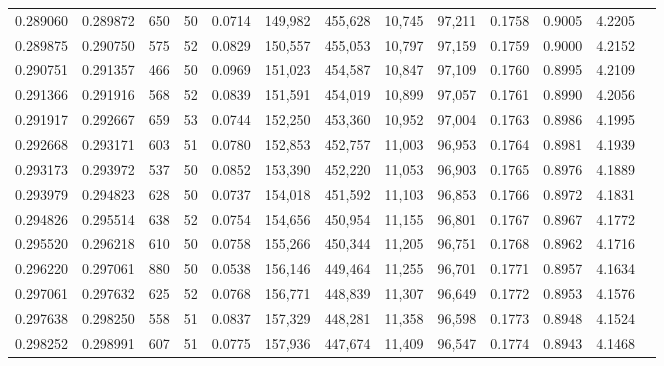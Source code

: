 \begin{tabular}{rrrrrrrrrrrrr}
0.289060 & 0.289872 &   650 &  50 &                                     0.0714 & 149,982 & 455,628 &  10,745 &  97,211 & 0.1758 & 0.9005 & 4.2205 \\
0.289875 & 0.290750 &   575 &  52 &                                     0.0829 & 150,557 & 455,053 &  10,797 &  97,159 & 0.1759 & 0.9000 & 4.2152 \\
0.290751 & 0.291357 &   466 &  50 &                                     0.0969 & 151,023 & 454,587 &  10,847 &  97,109 & 0.1760 & 0.8995 & 4.2109 \\
0.291366 & 0.291916 &   568 &  52 &                                     0.0839 & 151,591 & 454,019 &  10,899 &  97,057 & 0.1761 & 0.8990 & 4.2056 \\
0.291917 & 0.292667 &   659 &  53 &                                     0.0744 & 152,250 & 453,360 &  10,952 &  97,004 & 0.1763 & 0.8986 & 4.1995 \\
0.292668 & 0.293171 &   603 &  51 &                                     0.0780 & 152,853 & 452,757 &  11,003 &  96,953 & 0.1764 & 0.8981 & 4.1939 \\
0.293173 & 0.293972 &   537 &  50 &                                     0.0852 & 153,390 & 452,220 &  11,053 &  96,903 & 0.1765 & 0.8976 & 4.1889 \\
0.293979 & 0.294823 &   628 &  50 &                                     0.0737 & 154,018 & 451,592 &  11,103 &  96,853 & 0.1766 & 0.8972 & 4.1831 \\
0.294826 & 0.295514 &   638 &  52 &                                     0.0754 & 154,656 & 450,954 &  11,155 &  96,801 & 0.1767 & 0.8967 & 4.1772 \\
0.295520 & 0.296218 &   610 &  50 &                                     0.0758 & 155,266 & 450,344 &  11,205 &  96,751 & 0.1768 & 0.8962 & 4.1716 \\
0.296220 & 0.297061 &   880 &  50 &                                     0.0538 & 156,146 & 449,464 &  11,255 &  96,701 & 0.1771 & 0.8957 & 4.1634 \\
0.297061 & 0.297632 &   625 &  52 &                                     0.0768 & 156,771 & 448,839 &  11,307 &  96,649 & 0.1772 & 0.8953 & 4.1576 \\
0.297638 & 0.298250 &   558 &  51 &                                     0.0837 & 157,329 & 448,281 &  11,358 &  96,598 & 0.1773 & 0.8948 & 4.1524 \\
0.298252 & 0.298991 &   607 &  51 &                                     0.0775 & 157,936 & 447,674 &  11,409 &  96,547 & 0.1774 & 0.8943 & 4.1468 \\

\end{tabular}
